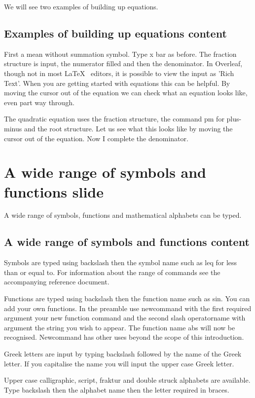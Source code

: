 \documentclass[a4paper,14pt]{extarticle}
\begin{document}
We will see two examples of building up equations. 

\subsection{Examples of building up equations content}

First a mean without summation symbol. Type x bar as before. The fraction structure is input, the numerator filled and then the denominator. In Overleaf, though not in most \LaTeX~ editors, it is possible to view the input as 'Rich Text'. When you are getting started with equations this can be helpful. By moving the cursor out of the equation we can check what an equation looks like, even part way through.

The quadratic equation uses the fraction structure, the command pm for plus-minus and the root structure. Let us see what this looks like by moving the cursor out of the equation. Now I complete the denominator. 

\section{A wide range of symbols and functions slide}

A wide range of symbols, functions and mathematical alphabets can be typed. 

\subsection{A wide range of symbols and functions content}

Symbols are typed using backslash then the symbol name such as leq for less than or equal to. For information about the range of commands see the accompanying reference document. 

Functions are typed using backslash then the function name such as sin. You can add your own functions. In the preamble use newcommand with the first required argument your new function command and the second slash operatorname with argument the string you wish to appear. The function name abs will now be recognised. Newcommand has other uses beyond the scope of this introduction.  

Greek letters are input by typing backslash followed by the name of the Greek letter. If you capitalise the name you will input the upper case Greek letter.

Upper case calligraphic, script, fraktur and double struck alphabets are available. Type backslash then the alphabet name then the letter required in braces. 
\end{document}
